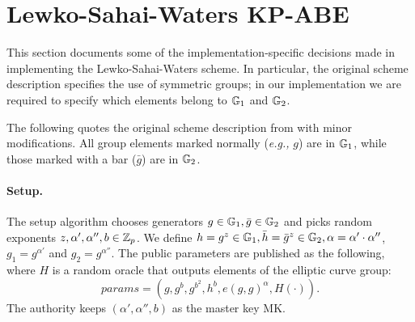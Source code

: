 \section{Lewko-Sahai-Waters KP-ABE \protect\cite{lsw09}}

\newcommand{\zkip}{{\textsc{zkip}}}
\newcommand{\vci}{{\textsc{vci}}}
\newcommand{\fip}{{\textsc{fip}}}
\newcommand{\start}{{\small{START}}}
\newcommand{\transcript}{{\small{TRANSCRIPT}}}
\newcommand{\expe}{{\textbf{Exp}}}
\newcommand{\pe}{$\mathcal{PE}$}
\newcommand{\enc}{$\mathcal{E}$}
\newcommand{\dec}{$\mathcal{D}$}
\newcommand{\key}{$\mathcal{K}$}
\newcommand{\GT}{\ensuremath{\mathbb{G}_T}}
\newcommand{\univ}{\mathcal{U}}
\newcommand{\zz}{\mathbb{Z}}
\newcommand{\parent}{\mathrm{parent}}
\newcommand{\sons}{\mathrm{CHILD}}
\newcommand{\ind}{\mathrm{index}}
\newcommand{\att}{\mathrm{att}}
\newcommand{\ghat}{e(g,g)}
\newcommand{\msp}{\mathrm{MSP}}
\newcommand{\PK}{params}
\newcommand{\genOne}{g}
\newcommand{\genTwo}{\bar{g}}
\newcommand{\hOne}{h}
\newcommand{\hTwo}{\bar{h}}

\newcommand{\MK}{\ensuremath{\textrm{MK}}}


\newcommand{\Decnode}{\ensuremath{\mathrm{DecryptNode}}}
\newcommand{\PolySat}{\ensuremath{\mathrm{PolySat}}}
\newcommand{\PolyUnsat}{\ensuremath{\mathrm{PolyUnsat}}}

This section documents some of the implementation-specific decisions made in implementing the Lewko-Sahai-Waters scheme.  In particular, the original scheme description specifies the use of symmetric groups; in our implementation we are required to specify which elements belong to ${\mathbb G}_1$ and ${\mathbb G}_2$.  

The following quotes the original scheme description from \cite{lsw09} with minor modifications.  All group elements marked normally ({\it e.g.,} $g$) are in ${\mathbb G}_1$, while those marked with a bar ($\genTwo$) are in ${\mathbb G}_2$.

\paragraph{Setup.}
The setup algorithm chooses generators $\genOne \in \gOne, \genTwo \in \gTwo$ and picks random exponents
$z, \alpha', \alpha'', b \in \mathbb{Z}_p$. We define $\hOne = \genOne^z \in \gOne, \hTwo = \genTwo^z \in \gTwo, \alpha = \alpha' \cdot \alpha''$, $\genOne_1 = \genOne^{\alpha'}$ and $\genOne_2 = g^{\alpha''}$. The public parameters are published as the following, where $H$ is a random oracle that outputs elements of the elliptic curve group:
\[
\PK=( g,
g^{b},
g^{b^{2}},
h^{b},
e(g,g)^{\alpha}, H(\cdot) ).
\]
The authority keeps $(\alpha', \alpha'', b)$ as the master key $\MK$.


